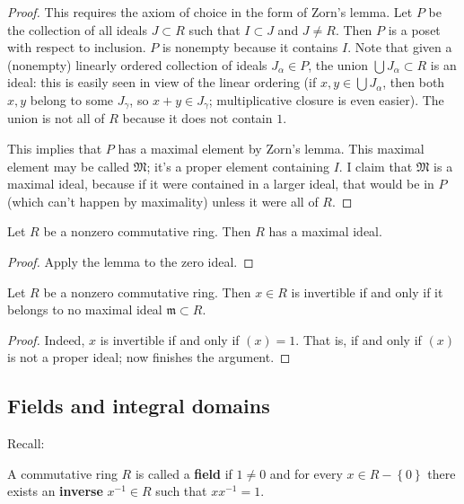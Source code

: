 \begin{proof} 
This requires the axiom of choice in the form of Zorn's lemma.  Let
$P$ be the collection of all ideals $J \subset R$ such that $I
\subset J$ and $J \neq R$.  Then $P$ is a poset with respect to  inclusion.  $P$ is
nonempty because it contains $I$.  Note that given a (nonempty) linearly ordered
collection of ideals $J_{\alpha} \in P$, the union $\bigcup J_{\alpha} \subset
R$ is an ideal: this is easily seen in view of the linear ordering (if $x,y
\in \bigcup J_{\alpha}$, then both $x,y$ belong to some $J_{\gamma}$, so $x+y
\in J_{\gamma}$; multiplicative closure is even easier). The union is not all
of $R$ because it does not contain $1$.  

This implies that $P$ has a maximal element by Zorn's lemma.  This maximal element may
be called $\mathfrak{M}$; it's a proper element containing $I$. I claim that
$\mathfrak{M}$ is a maximal ideal, because if it were contained in a larger
 ideal, that would  be in $P$ (which can't happen by maximality) unless it were all of $R$.
\end{proof} 

\begin{corollary} 
Let $R $ be a nonzero commutative ring.  Then $R$ has a maximal ideal.
\end{corollary} 
\begin{proof} 
Apply the lemma to the zero ideal.  
\end{proof} 

\begin{corollary} 
Let $R$ be a nonzero commutative ring. Then $x \in R$ is invertible if and
only if it belongs to no maximal ideal $\mathfrak{m} \subset R$.
\end{corollary} 
\begin{proof} 
Indeed, $x$ is invertible if and only if $(x) = 1$. That is, if and only if
$(x)$ is not a proper ideal; now 
finishes the argument.
\end{proof} 

\subsection{Fields and integral domains}

Recall:

\begin{definition} 
A commutative ring $R$ is called a  \textbf{field} if $1 \neq 0$ and for every $x \in R -
\left\{0\right\}$ there exists an \textbf{inverse} $x^{-1} \in R$ such that $xx^{-1} =
1$.


\end{definition}


